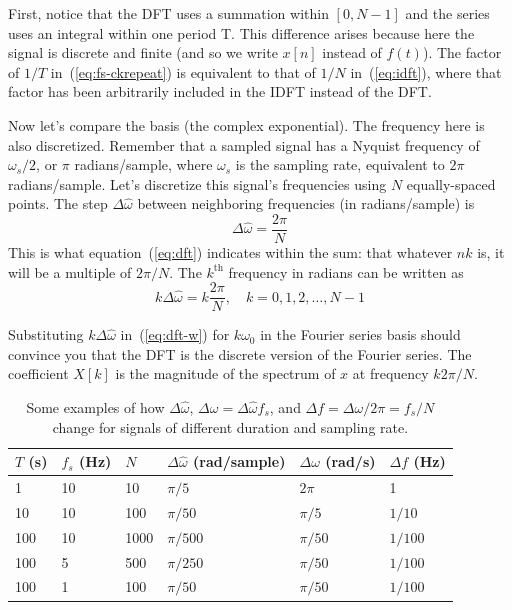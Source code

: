 First, notice that the DFT uses a summation within $[0, N-1]$ and the
series uses an integral within one period T.  This difference arises
because here the signal is discrete and finite (and so we write $x[n]$
instead of $f(t)$). The factor of $1/T$ in~(\ref{eq:fs-ckrepeat}) is
equivalent to that of $1/N$ in~(\ref{eq:idft}), where 
that factor has been arbitrarily included in the IDFT instead of the DFT.

Now let's compare the basis (the complex exponential). The frequency
here is also discretized.  Remember that a sampled signal has a
Nyquist frequency of $\omega_s/2$, or $\pi$ radians/sample, where
$\omega_s$ is the sampling rate, equivalent to $2\pi$ radians/sample.
Let's discretize this signal's frequencies using $N$ equally-spaced
points.  The step $\Delta\hat{\omega}$ between neighboring frequencies (in
radians/sample) is
\begin{equation}
\Delta\hat{\omega} = \frac{2\pi}{N}
\end{equation}
This is what equation~(\ref{eq:dft}) indicates within the sum: that
whatever $nk$ is, it will be a multiple of $2\pi/N$.  The
$k^\mathrm{th}$ frequency in radians can be written as
\begin{equation}
k \Delta\hat{\omega} = k\frac{2\pi}{N}, \quad k = 0, 1, 2, \ldots, N-1
\label{eq:dft-w}
\end{equation}

Substituting $k \Delta\hat{\omega}$ in~(\ref{eq:dft-w}) for
$k\omega_0$ in the Fourier series basis should convince you that the
DFT is the discrete version of the Fourier series. The coefficient
$X[k]$ is the magnitude of the spectrum of $x$ at frequency $k2\pi/N$.

\begin{table}
  \centering
  \begin{tabular}{|l|l|l|l|l|l|} \hline
    $T$ (s) & $f_s$ (Hz) & $N$ & $\Delta\hat{\omega}$ (rad/sample) &
    $\Delta\omega$ (rad/s) & $\Delta f$ (Hz) \\ \hline
    1    & 10    & 10    & $\pi/5$    & $2\pi$    & 1 \\
    10   & 10    & 100   & $\pi/50$   & $\pi/5$   & $1/10$ \\
    100  & 10    & 1000  & $\pi/500$  & $\pi/50$  & $1/100$ \\
    100  & 5     & 500   & $\pi/250$  & $\pi/50$  & $1/100$ \\
    100  & 1     & 100   & $\pi/50$   & $\pi/50$  & $1/100$ \\ \hline
  \end{tabular}
  \caption{Some examples of how $\Delta\hat{\omega}$,
    $\Delta\omega=\Delta\hat{\omega}f_s$, 
    and $\Delta f=\Delta\omega/2\pi = f_s/N$ change for signals of
    different duration and sampling rate.} 
  \label{tb:delta-f}
\end{table}

